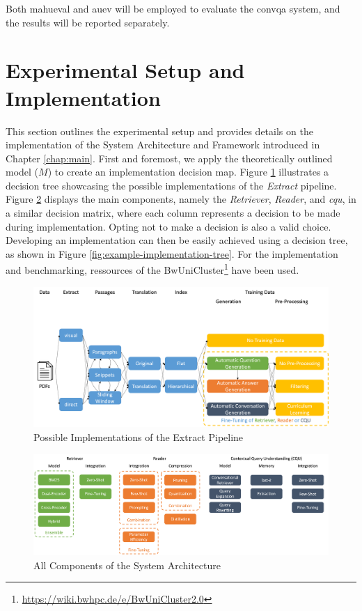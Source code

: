 Both \gls{mahueval} and \gls{auev} will be employed to evaluate the \gls{convqa} system, and the results will be reported separately.

\section{Experimental Setup and Implementation}
\label{sec:setup}

This section outlines the experimental setup and provides details on the implementation of the System Architecture and Framework introduced in Chapter \ref{chap:main}. First and foremost, we apply the theoretically outlined model ($M$) to create an implementation decision map. Figure \ref{fig:extract-pipeline-implementation-grid} illustrates a decision tree showcasing the possible implementations of the \textit{Extract} pipeline. Figure \ref{fig:all-components-conrag-grid} displays the main components, namely the \textit{Retriever}, \textit{Reader}, and \textit{\gls{cqu}}, in a similar decision matrix, where each column represents a decision to be made during implementation. Opting not to make a decision is also a valid choice. Developing an implementation can then be easily achieved using a decision tree, as shown in Figure \ref{fig:example-implementation-tree}. For the implementation and benchmarking, ressources of the BwUniCluster\footnote{\url{https://wiki.bwhpc.de/e/BwUniCluster2.0}} have been used.

\begin{figure}
    \centering
    \includegraphics[width=\textwidth]{Grafiken/extract_pipeline.png}
    \caption{Possible Implementations of the Extract Pipeline}
    \label{fig:extract-pipeline-implementation-grid}
\end{figure}

\begin{figure}
    \centering
    \includegraphics[width=\textwidth]{Grafiken/all_components_conrag.png}
    \caption{All Components of the System Architecture}
    \label{fig:all-components-conrag-grid}
\end{figure}

